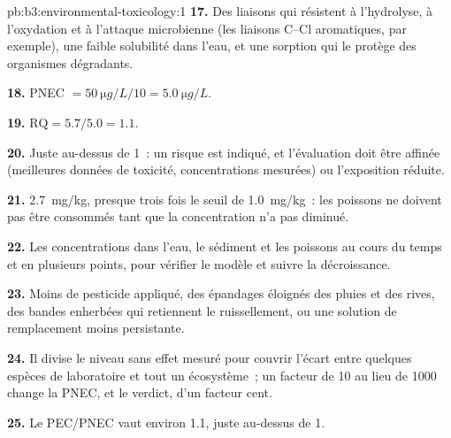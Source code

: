 \begin{solution}{pb:b3:environmental-toxicology:1}
\textbf{17.} Des liaisons qui résistent à l'hydrolyse, à l'oxydation et à
l'attaque microbienne (les liaisons C--Cl aromatiques, par exemple), une
faible solubilité dans l'eau, et une sorption qui le protège des
organismes dégradants.

\textbf{18.} PNEC $= \qty{50}{\micro g/L}/10 = \qty{5.0}{\micro g/L}$.

\textbf{19.} $\mathrm{RQ} = 5.7/5.0 = 1.1$.

\textbf{20.} Juste au-dessus de 1~: un risque est indiqué, et l'évaluation
doit être affinée (meilleures données de toxicité, concentrations
mesurées) ou l'exposition réduite.

\textbf{21.} \qty{2.7}{mg/kg}, presque trois fois le seuil de \qty{1.0}{mg/kg}~: les poissons ne doivent pas être consommés
tant que la concentration n'a pas diminué.

\textbf{22.} Les concentrations dans l'eau, le sédiment et les poissons au
cours du temps et en plusieurs points, pour vérifier le modèle et suivre
la décroissance.

\textbf{23.} Moins de pesticide appliqué, des épandages éloignés des pluies
et des rives, des bandes enherbées qui retiennent le ruissellement, ou une
solution de remplacement moins persistante.

\textbf{24.} Il divise le niveau sans effet mesuré pour couvrir l'écart
entre quelques espèces de laboratoire et tout un écosystème~; un facteur de
10 au lieu de 1000 change la PNEC, et le verdict, d'un facteur cent.

\textbf{25.} Le  PEC/PNEC vaut environ 1.1, juste au-dessus de 1.
\end{solution}
